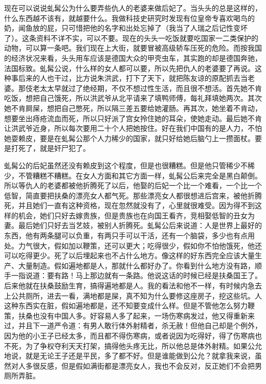 现在可以说说虬髯公为什么要弄些仇人的老婆来做后妃了。当头头的总是这样的，什么东西越不该有，就越要什么。我做科技史研究时发现有位皇帝专喜欢喝鸟的奶，闻鱼放的屁，只可惜把他的名字和出处忘掉了（我当了人瑞之后记性变坏了）。这条资料不详不实，可以不要。现在的头头一吃饭就要吃国家一二类保护的动物，可以算一条吧。我们现在上大街，就要冒被高级轿车压死的危险。而按我国的经济状况来看，头头用车应该是德国大众的甲壳虫车，其实跑的却是德国奔驰，法国标致。虬髯公说，什么样的女人都可以要，所以先把仇人的老婆要了再说。这种事后来的人也干过，比方说朱洪武，打下了天下，就把陈友谅的原配抓去当老婆。那伎老太太早就过了绝经期，不仅不想过性生活，而且很不想活。首先她不肯吃饭，想把自己饿死，所以洪武爷从北平请来了填鸭师傅，每礼拜填她两次。其次她不肯屙屎，想把自己憋死，所以隔三差五要给她灌肠。再其次，她坐着不肯动，想要坐出痔疮流血而死，所以只好派了宫女拎住她的耳朵，使她走动。最后她不肯让洪武爷近身，所以每次要用二十个人把她按住。好在我们中国有的是人力，不怕她耍赖皮，要是在虬髯公那个人力稀少的国家，就只好给她后脑勺上一攒面杖。要是打死了，就是奸尸犯了。 

虬髯公的后妃虽然还没有赖皮到这个程度，但是也很糟糕。但是他只管稀少不稀少，不管糟糕不糟糕。在女人方面和其它方面一样，虬髯公后来完全是黑白颠倒。所以等仇人的老婆都被他折腾死了以后，他娶的后妃一个比一个难看，一个比一个低智，简直要把扶桑的漂亮女人都气死。那些漂亮女人都很想进后宫来，被他折腾死，并且她们一直有这种资格，现在忽然就没有了，心里就很难受。因为得不到这样的机会，她们只好去嫁贵族，但是贵族也在向国王看齐，竞相娶低智的丑女为妻。最后她们只好去当艺妓，被别人折腾死。虬髯公后来说道：人是世界上最好的东西，他有两条腿可以负重，有两只手可以干活，还有一个脑袋，多少也有点用处。力气很大，假如加以鞭策，还可以更大；吃得很少，假如你不怕他饿死，他还可以吃得更少。死了以后埋起来也不占什么地方。像这样的好东西完全应该大量生产、大量制造。假如遍地都是人，那就什么都好办了。你看到什么地方没有路，顺手一指说道：要有路！马上那边就有一条路。他说这话的时候已经是扶桑国王了。后来他就在扶桑鼓励生育，搞得遍地都是人。我的看法和他不一样，有时候内急去上公共厕所，进去一看，满地都是屎，真不知为什么要修这座房子，挖这些坑。人这种东西实在脏，假如遍地都是，还不知要变成什么样。但是不管他怎么努力鞭策，扶桑也没有中国人多。好容易人多了起来，一场伤寒病发过，他又得重新来过，并且下一道严令道：有男人敢行体外射精者，杀无赦！但他自己却是个例外，因为他的小王子已经太多，而且都不得伤寒病，或者说因为吃得好，得了伤寒病也不死，为了争权夺利天天打架，搞得他头疼无比，所以他总是体外射精。如果公允地说，就是无论王子还是平民，多了都不好。但是谁能做到公允？就拿我来说，虽然对人多很反感，但是假如满街都是漂亮女人，我也不会反对，反正她们不会把男厕所弄脏。 

